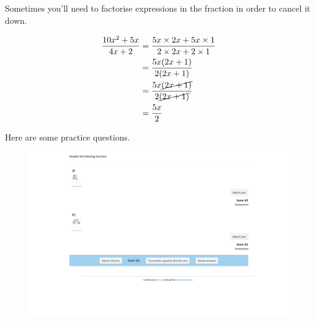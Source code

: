 \documentclass[
  a4paper,
]{scrbook}
\begin{document}
Sometimes you'll need to factorise expressions in the fraction in order
to cancel it down.

\[
\begin{aligned} \frac{10x^2 + 5x}{4x+2} &= \frac{5x \times 2x + 5x \times 1}{2 \times 2x + 2 \times 1} \\
&= \frac{5x(2x+1)}{2(2x+1)} \\
&= \frac{5x\cancel{(2x+1)}}{2\cancel{(2x+1)}} \\
&= \frac{5x}{2}
\end{aligned}
\]

Here are some practice questions.

\begin{figure}

{\centering 

\href{https://numbas.mathcentre.ac.uk/question/127104/algebra-cancelling-fractions/embed/?token=17a9a4e4-a12e-4563-affd-e77faf02f68e}{\includegraphics{./04-fractions_files/figure-pdf/unnamed-chunk-2-1.png}}

}

\end{figure}
\end{document}
